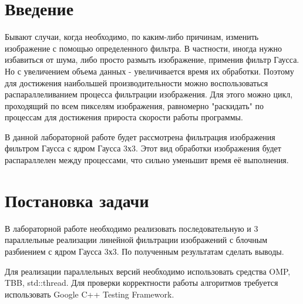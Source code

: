 \documentclass{report}
\begin{document}
\setcounter{page}{2}

\tableofcontents
\newpage

\section*{Введение}
Бывают случаи, когда необходимо, по каким-либо причинам, изменить изображение с помощью определенного фильтра. В частности, иногда нужно избавиться от шума, либо просто размыть изображение, применив фильтр Гаусса. Но с увеличением объема данных - увеличивается время их обработки. Поэтому для достижения наибольшей производительности можно воспользоваться распараллеливанием процесса фильтрации изображения. Для этого можно цикл, проходящий по всем пикселям изображения, равномерно "раскидать" по процессам для достижения прироста скорости работы программы.
\par В данной лабораторной работе будет рассмотрена фильтрация изображения фильтром Гаусса с ядром Гаусса 3х3. Этот вид обработки изображения будет распараллелен между процессами, что сильно уменьшит время её выполнения.
\newpage

\section*{Постановка задачи}
В лабораторной работе необходимо реализовать последовательную и 3 параллельные реализации линейной фильтрации изображений с блочным разбиением с ядром Гаусса 3х3. По полученным результатам сделать выводы.
\par Для реализации параллельных версий необходимо использовать средства OMP, TBB, std::thread. Для проверки корректности работы алгоритмов требуется использовать Google C++ Testing Framework.
\newpage

\end{document}
